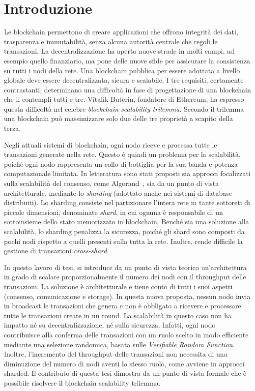\chapter{Introduzione}

Le blockchain permettono di creare applicazioni che offrono integrità dei dati, trasparenza e immutabilità, senza alcuna autorità centrale che regoli le transazioni. La decentralizzazione ha aperto nuove strade in molti campi, ad esempio quello finanziario, ma pone delle nuove sfide per assicurare la consistenza su tutti i nodi della rete. Una blockchain pubblica per essere adottata a livello globale deve essere decentralizzata, sicura e scalabile. I tre requisiti, certamente contrastanti, determinano una difficoltà in fase di progettazione di una blockchain che li contempli tutti e tre. Vitalik Buterin, fondatore di Ethereum, ha espresso questa difficoltà nel celebre \textit{blockchain scalability trilemma}. Secondo il trilemma una blockchain può massimizzare solo due delle tre proprietà a scapito della terza.

Negli attuali sistemi di blockchain, ogni nodo riceve e processa tutte le transazioni generate nella rete. Questo è quindi un problema per la scalabilità, poiché ogni nodo rappresenta un collo di bottiglia per la sua banda e potenza computazionale limitata. In letteratura sono stati proposti sia approcci focalizzati sulla scalabilità del consenso, come Algorand~\cite{gilad2017algorand}, sia da un punto di vista architetturale, mediante lo \textit{sharding} (adottato anche nei sistemi di database distribuiti). Lo sharding consiste nel partizionare l'intera rete in tante sottoreti di piccole dimensioni, denominate \textit{shard}, in cui ognuna è responsabile di un sottoinsieme dello stato memorizzato in blockchain. Benché sia una soluzione alla scalabilità, lo sharding penalizza la sicurezza, poiché gli shard sono composti da pochi nodi rispetto a quelli presenti sulla tutta la rete. Inoltre, rende difficile la gestione di transazioni \textit{cross-shard}.

In questo lavoro di tesi, si introduce da un punto di vista teorico un'architettura in grado di scalare proporzionalmente il numero dei nodi con il throughput delle transazioni. La soluzione è architetturale e tiene conto di tutti i suoi aspetti (consenso, comunicazione e storage). In questa nuova proposta, nessun nodo invia in broadcast le transazioni che genera e non è obbligato a ricevere e processare tutte le transazioni create in un round. La scalabilità in questo caso non ha impatto né su decentralizzazione, né sulla sicurezza. Infatti, ogni nodo contribuisce alla conferma delle transazioni con un ruolo scelto in modo efficiente mediante una selezione randomica, basata sulle \textit{Verifiable Random Function}. Inoltre, l'incremento del throughput delle transazioni non necessita di una diminuzione del numero di nodi aventi lo stesso ruolo, come avviene in approcci sharded. Il contributo di questa tesi dimostra da un punto di vista formale che è possibile risolvere il blockchain scalability trilemma.

